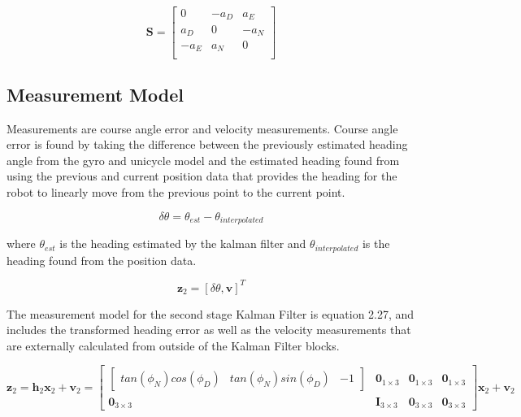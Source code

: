 \begin{equation}
  \boldsymbol{S} = \begin{bmatrix}
        0 & -a_D & a_E \\
        a_D & 0 & -a_N \\
        -a_E & a_N & 0 \\
      \end{bmatrix}
\end{equation}

\subsection{Measurement Model}

Measurements are course angle error and velocity measurements. Course angle error
is found by taking the difference between the previously estimated heading angle from the 
gyro and unicycle model and the estimated heading found from using the previous 
and current position data that provides the heading for the robot to linearly 
move from the previous point to the current point.

\begin{equation}
  \delta\theta = \theta_{est} - \theta_{interpolated}
\end{equation}

where $\theta_{est}$ is the heading estimated by the kalman filter and $\theta_{interpolated}$ 
is the heading found from the position data. 

\begin{equation}
  \boldsymbol{z}_2 = [\delta\theta, \boldsymbol{v}]^T
\end{equation}

The measurement model for the second stage Kalman Filter is equation 2.27, and includes 
the transformed heading error as well as the velocity measurements 
that are externally calculated from outside of the Kalman Filter blocks. 

\begin{equation}
  \boldsymbol{z}_2 = \boldsymbol{h}_2 \boldsymbol{x}_2 + \boldsymbol{v}_2 = \begin{bmatrix}
      \begin{bmatrix}tan(\phi_N)cos(\phi_D) & tan(\phi_N)sin(\phi_D) & -1\end{bmatrix} & \boldsymbol{0}_{1\times3} & \boldsymbol{0}_{1\times3} & \boldsymbol{0}_{1\times3} \\
      \boldsymbol{0}_{3\times3} & \boldsymbol{I}_{3\times3} & \boldsymbol{0}_{3\times3} & \boldsymbol{0}_{3\times3}
      \end{bmatrix}\boldsymbol{x}_2 + \boldsymbol{v}_2
\end{equation}

